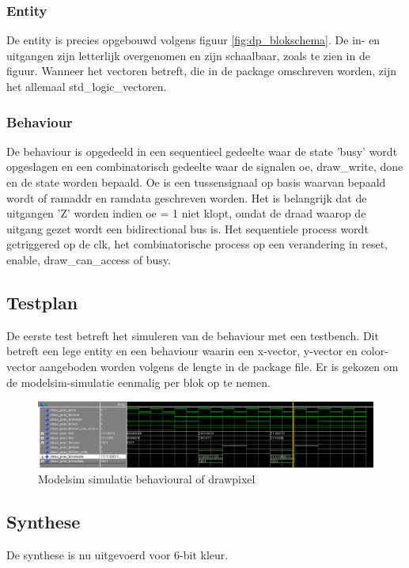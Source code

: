 \documentclass{scrartcl} %
\begin{document}
\subsubsection{Entity}
De entity is precies opgebouwd volgens  figuur  \ref{fig:dp_blokschema}. De in- en uitgangen zijn letterlijk overgenomen en zijn schaalbaar, zoals te zien in de figuur. Wanneer het vectoren betreft, die in de package omschreven worden, zijn het allemaal std\_logic\_vectoren. 

\subsubsection{Behaviour}
De behaviour is opgedeeld in een sequentieel gedeelte waar de state 'busy' wordt opgeslagen en een combinatorisch gedeelte waar de signalen oe, draw\_write, done en de state worden bepaald. Oe is een tussensignaal op basis waarvan bepaald wordt of ramaddr en ramdata geschreven worden. Het is belangrijk dat de uitgangen 'Z' worden indien oe = 1 niet klopt, omdat de draad waarop de uitgang gezet wordt een bidirectional bus is. Het sequentiele process wordt getriggered op de clk, het combinatorische process op een verandering in reset, enable, draw\_can\_access of busy. 

\subsection{Testplan}
De eerste test betreft het simuleren van de behaviour met een testbench. Dit betreft een lege entity en een behaviour waarin een x-vector, y-vector en color-vector aangeboden worden volgens de lengte in de package file. Er is gekozen om de modelsim-simulatie eenmalig per blok op te nemen. 
\begin{figure} [h!]
\centering
\includegraphics [scale = 0.7] {resource/dp_sim}
\caption{Modelsim simulatie behavioural of drawpixel}
\label{fig:dp_sim}
\end{figure}

\subsection{Synthese}
De synthese is nu uitgevoerd voor 6-bit kleur. 
\end{document}
